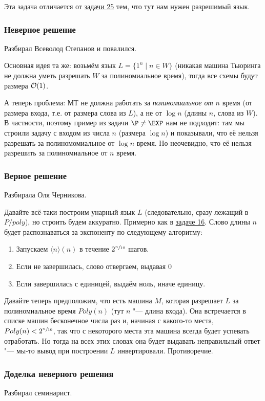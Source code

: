 	Эта задача отличается от \hyperref[prob25]{задачи 25} тем, что тут нам нужен разрешимый язык.
	\subsubsection{Неверное решение}
		Разбирал Всеволод Степанов и повалился.

		Основная идея та же: возьмём язык $L=\{1^n \mid n \in W\}$ (никакая машина Тьюринга не должна уметь разрешать $W$ за полиномиальное время),
		тогда все схемы будут размера $\mathcal O(1)$.

		А теперь проблема: МТ не должна работать за \textit{полиномиальное от $n$} время (от размера входа,
		т.е. от размера слова из $L$), а не от $\log n$ (длины $n$, слова из $W$).
		В частности, поэтому пример из задачи $\P \neq \EXP$ нам не подходит:
		там мы строили задачу с входом из числа $n$ (размера $\log n$) и показывали,
		что её нельзя разрешать за полиномомиальное от $\log n$ время.
		Но неочевидно, что её нельзя разрешить за полиномиальное от $n$ время.

	\subsubsection{Верное решение}
		Разбирала Оля Черникова.

		Давайте всё-таки построим унарный язык $L$ (следовательно, сразу лежащий в $P/poly$), но строить будем аккуратно.
		Примерно как в \hyperref[prob16]{задаче 16}.
		Слово длины $n$ будет распознаваться за экспоненту по следующему алгоритму:
		\begin{enumerate}
			\item
				Запускаем $\langle n \rangle (n)$ в течение $2^{\sfrac n {10}}$ шагов.
			\item
				Если не завершилась, слово отвергаем, выдавая 0
			\item
				Если завершилась с единицей, выдаём ноль, иначе единицу.
		\end{enumerate}
		Давайте теперь предположим, что есть машина $M$, которая разрешает $L$ за полиномиальное время $Poly(n)$ (тут $n$ "--- длина входа).
		Она встречается в списке машин бесконечное числа раз и, начиная с какого-то места,
		$Poly(n) < 2^{\sfrac n {10}}$, так что с некоторого места эта машина всегда будет успевать отработать.
		Но тогда на всех этих словах она будет выдавать неправильный ответ "--- мы-то вывод при построении $L$ инвертировали.
		Противоречие.

	\subsubsection{Доделка неверного решения}
		Разбирал семинарист.

